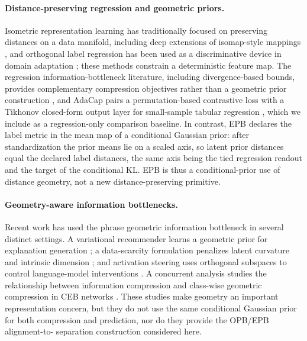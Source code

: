 \paragraph{Distance-preserving regression and geometric priors.}
Isometric representation learning has traditionally focused on preserving distances
on a data manifold, including deep extensions of isomap-style mappings
\citep{pai2022isometric}, and orthogonal label regression has been used as a
discriminative device in domain adaptation \citep{luo2023doll}; these methods
constrain a deterministic feature map. The regression information-bottleneck
literature, including divergence-based bounds, provides complementary compression
objectives rather than a geometric prior construction \citep{yu2024csd_ib}, and
AdaCap pairs a permutation-based contrastive loss with a Tikhonov closed-form
output layer for small-sample tabular regression \citep{belucci2026adacap}, which
we include as a regression-only comparison baseline. In contrast, EPB declares the
label metric in the mean map of a conditional Gaussian prior: after
standardization the prior means lie on a scaled axis, so latent prior distances
equal the declared label distances, the same axis being the tied regression
readout and the target of the conditional KL. EPB is thus a conditional-prior use
of distance geometry, not a new distance-preserving primitive.

\paragraph{Geometry-aware information bottlenecks.}
Recent work has used the phrase geometric information bottleneck in several distinct
settings. A variational recommender learns a geometric prior for explanation
generation \citep{yan2024geometric_ib}; a data-scarcity formulation penalizes latent
curvature and intrinsic dimension \citep{katende2025vgib}; and activation steering
uses orthogonal subspaces to control language-model interventions
\citep{doan2026geometric_ib}. A concurrent analysis studies the relationship between
information compression and class-wise geometric compression in CEB networks
\citep{adilova2026geometric_compression}. These studies make geometry an important
representation concern, but they do not use the same conditional Gaussian prior for
both compression and prediction, nor do they provide the OPB/EPB alignment-to-
separation construction considered here.


